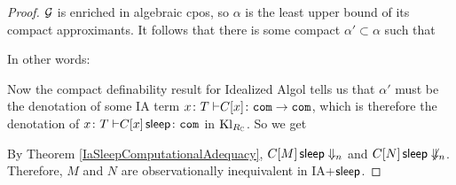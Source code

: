 \documentclass{article}
\begin{document}
\begin{proof}
  $\mathcal G$ is enriched in algebraic cpos, so $\alpha$ is the least upper bound of its compact approximants.  
  It follows that there is some compact $\alpha'\subset \alpha$ such that
  In other words:
  Now the compact definability result for Idealized Algol \cite[17]{SamsonGuyIAActive} tells us that $\alpha'$ must be the denotation of some IA term $x\colon T {\;\vdash} C[x] \colon {\mathtt{com}} \to {\mathtt{com}}$, which is therefore the denotation of $x\colon T {\;\vdash} C[x]\,{\mathsf{sleep}} \colon {\mathtt{com}}$ in $\operatorname{Kl}_{R_{\mathbb{C}}}$.
  So we get
  By Theorem \ref{IaSleepComputationalAdequacy}, $C[M]\,{\mathsf{sleep}}\Downarrow_n$ and $C[N]\,{\mathsf{sleep}}\not\Downarrow_n$.  
  Therefore, $M$ and $N$ are observationally inequivalent in IA+${\mathsf{sleep}}$.
\end{proof}



\end{document}
